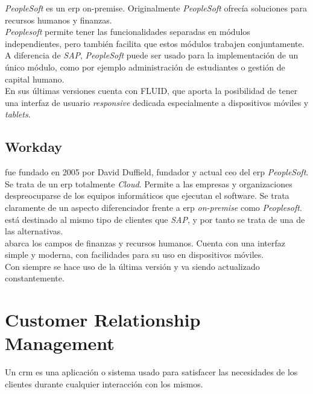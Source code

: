 \textit{PeopleSoft} es un \acrshort{erp} \gls{on-premise}.
Originalmente \textit{PeopleSoft} ofrecía soluciones para recursos humanos y finanzas.\\

\textit{Peoplesoft} permite tener las funcionalidades separadas en módulos independientes, pero también facilita que estos módulos trabajen conjuntamente.
A diferencia de \textit{SAP}, \textit{PeopleSoft} puede ser usado para la implementación de un único módulo, como por ejemplo administración de estudiantes o gestión de capital humano.\cite{anderson_2001}\\

En sus últimas versiones cuenta con FLUID, que aporta la posibilidad de tener una interfaz de usuario \textit{responsive} dedicada especialmente a dispositivos móviles y \textit{tablets}.


\subsection{Workday}
\wday{} fue fundado en 2005 por David Duffield, fundador y actual \acrshort{ceo} del \acrshort{erp} \textit{PeopleSoft}.\\



Se trata de un \acrshort{erp} totalmente \textit{Cloud}. Permite a las empresas y organizaciones despreocuparse de los equipos informáticos que ejecutan el software. Se trata claramente de un aspecto diferenciador frente a \acrshort{erp} \textit{on-premise} como \textit{Peoplesoft}. 
\wday{} está destinado al mismo tipo de clientes que \textit{SAP}, y por tanto se trata de una de las alternativas.\\


\wday{} abarca los campos de finanzas y recursos humanos. Cuenta con una interfaz simple y moderna, con facilidades para su uso en dispositivos móviles.\\

Con \wday{} siempre se hace uso de la última versión y va siendo actualizado constantemente.


\section{Customer Relationship Management}

Un \acrfull{crm} es una aplicación o sistema usado para satisfacer las necesidades de los clientes durante cualquier interacción con los mismos.\\


